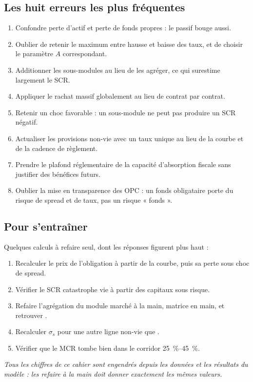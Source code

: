 \documentclass[11pt,a4paper]{article}
\newcommand{\Meuro}{\text{M\texteuro}}
\begin{document}
\subsection{Les huit erreurs les plus fréquentes}

\begin{enumerate}
\item Confondre perte d'actif et perte de fonds propres : le passif bouge aussi.
\item Oublier de retenir le maximum entre hausse et baisse des taux, et de choisir le paramètre
      $A$ correspondant.
\item Additionner les sous-modules au lieu de les agréger, ce qui surestime largement le SCR.
\item Appliquer le rachat massif globalement au lieu de contrat par contrat.
\item Retenir un choc favorable : un sous-module ne peut pas produire un SCR négatif.
\item Actualiser les provisions non-vie avec un taux unique au lieu de la courbe et de la cadence
      de règlement.
\item Prendre le plafond réglementaire de la capacité d'absorption fiscale sans justifier des
      bénéfices futurs.
\item Oublier la mise en transparence des OPC : un fonds obligataire porte du risque de spread et
      de taux, pas un risque « fonds ».
\end{enumerate}

\subsection{Pour s'entraîner}

Quelques calculs à refaire seul, dont les réponses figurent plus haut :
\begin{enumerate}
\item Recalculer le prix de l'obligation \OblId{} à partir de la courbe, puis sa perte sous choc
      de spread.
\item Vérifier le SCR catastrophe vie à partir des capitaux sous risque.
\item Refaire l'agrégation du module marché à la main, matrice en main, et retrouver
      \MarcheAgrege{} \Meuro{}.
\item Recalculer $\sigma_s$ pour une autre ligne non-vie que \NvLob{}.
\item Vérifier que le MCR tombe bien dans le corridor \qty{25}{\percent}–\qty{45}{\percent}.
\end{enumerate}

\vfill
\begin{center}\small\itshape
Tous les chiffres de ce cahier sont engendrés depuis les données et les résultats du modèle :
les refaire à la main doit donner exactement les mêmes valeurs.
\end{center}
\end{document}
